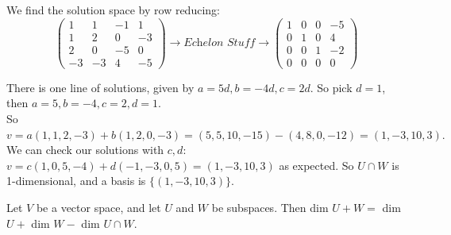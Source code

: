 \documentclass[twoside]{scrartcl}
\begin{document}
\begin{examples}
We find the solution space by row reducing:
\[
\begin{pmatrix}
1 & 1 & -1 & 1\\
1 & 2 & 0 & -3\\
2 & 0 & -5 & 0\\
-3 & -3 & 4 & -5
\end{pmatrix} \rightarrow \textit{Echelon Stuff} \rightarrow
 \begin{pmatrix}
 1 & 0 & 0 & -5\\
 0 & 1 & 0 & 4\\
 0 & 0 & 1 & -2\\
 0 & 0 & 0 & 0
 \end{pmatrix}  \]

There is one line of solutions, given by $a = 5d, b = -4d, c = 2d.$ So pick $d = 1$, then $a = 5, b = -4, c = 2, d =1$.\\ 

So $v = a(1,1,2,-3) + b(1,2,0,-3) = (5,5,10,-15) - (4,8,0,-12) = (1,-3,10,3).$\\

We can check our solutions with $c,d$: $v = c(1,0,5,-4) + d(-1,-3,0,5) = (1,-3,10,3)$ as expected. So $U \cap W$ is 1-dimensional, and a basis is $\{(1,-3,10,3)\}$.
\end{examples}


\begin{theorem} Let $V$ be a vector space, and let $U$ and $W$ be subspaces. Then dim $U + W = $ dim $U + $ dim $W - $ dim $U \cap W$.	
\end{theorem}
\end{document}
